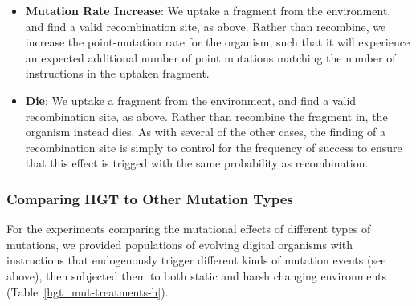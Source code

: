 \documentclass[PhD]{msu-thesis}
\begin{document}
\begin{itemize}
	\item \textbf{Mutation Rate Increase}: We uptake a fragment from the environment, and find a valid recombination site, as above. Rather than recombine, we increase the point-mutation rate for the organism, such that it will experience an expected additional number of point mutations matching the number of instructions in the uptaken fragment.

	\item \textbf{Die}: We uptake a fragment from the environment, and find a valid recombination site, as above. Rather than recombine the fragment in, the organism instead dies.	 As with several of the other cases, the finding of a recombination site is simply to control for the frequency of success to ensure that this effect is trigged with the same probability as recombination.
\end{itemize}	

\subsubsection{Comparing HGT to Other Mutation Types}

For the experiments comparing the mutational effects of different types of mutations, we provided populations of evolving digital organisms with instructions that endogenously trigger different kinds of mutation events (see above), then subjected them to both static and harsh changing environments (Table~\ref{hgt_mut-treatments-h}).  
\end{document}
